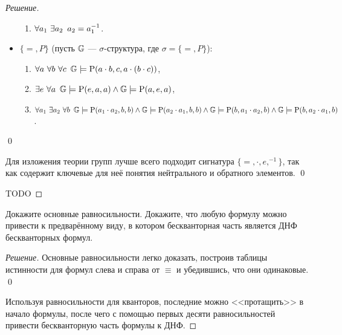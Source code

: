 \begin{proof}[Решение]
\begin{itemize}
\begin{enumerate}
                \item \(\forall a_1 \ \exists a_2 \enskip a_2 = a_1^{-1}\).
            \end{enumerate}
            \item \(\{=, P\}\) (пусть \(\mathbb{G}\) --- \(\sigma\)-структура, где \(\sigma = \{=, P\}\)):
            \begin{enumerate}
                \item \(\forall a \ \forall b \ \forall c \enskip \mathbb{G} \models \operatorname{P}(a \cdot b, c, a \cdot (b \cdot c))\),
                \item \(\exists e \ \forall a \enskip \mathbb{G} \models \operatorname{P}(e, a, a) \land \mathbb{G} \models \operatorname{P}(a, e, a)\),
                \item \(\forall a_1 \ \exists a_2 \ \forall b \enskip \mathbb{G} \models \operatorname{P}(a_1 \cdot a_2, b, b) \land \mathbb{G} \models \operatorname{P}(a_2 \cdot a_1, b, b) \land \mathbb{G} \models \operatorname{P}(b, a_1 \cdot a_2, b) \land \mathbb{G} \models \operatorname{P}(b, a_2 \cdot a_1, b)\).
            \end{enumerate}
        \end{itemize}
        \qed

        Для изложения теории групп лучше всего подходит сигнатура \(\{=, \cdot, e, ^{-1}\}\), так как содержит ключевые для неё понятия нейтрального и обратного элементов. \qed

        TODO
    \end{proof}

    \begin{problem}[2]
        Докажите основные равносильности. Докажите, что любую формулу можно привести к предварённому виду, в котором бескванторная часть является ДНФ бескванторных формул.
    \end{problem}
    \begin{proof}[Решение]
        Основные равносильности легко доказать, построив таблицы истинности для формул слева и справа от \(\equiv\) и убедившись, что они одинаковые. \qed

        Используя равносильности для кванторов, последние можно <<протащить>> в начало формулы, после чего с помощью первых десяти равносильностей привести бескванторную часть формулы к ДНФ. 
    \end{proof}

